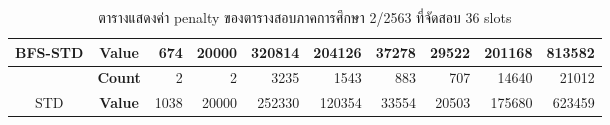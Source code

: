\begin{table}[]
{\begin{tabular}{@{}ccrrrrrrrr@{}}
    \multirow{-2}{*}{BFS-STD}                    & \textbf{Value}                        & 674                            & 20000                          & 320814                         & 204126                         & 37278                          & 29522                          & 201168                         & 813582                           \\ \midrule
                                                  & {\textbf{Count}} & {2}       & {2}       & {3235}    & {1543}    & {883}     & {707}     & {14640}   & {21012}     \\ \cmidrule(l){2-10} 
    \multirow{-2}{*}{STD} & {\textbf{Value}} & {1038}    & {20000}   & {252330}  & {120354}  & {33554}   & {20503}   & {175680}  & {623459}    \\ \bottomrule
    \end{tabular}%
    }
    \caption{ตารางแสดงค่า penalty ของตารางสอบภาคการศึกษา 2/2563 ที่จัดสอบ 36 slots}
    \label{tab:result_table_263_36}
\end{table}
